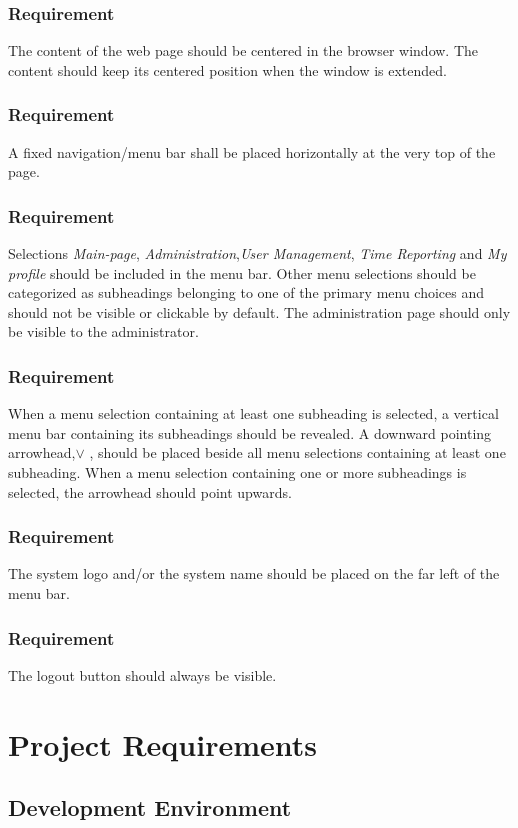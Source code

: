 \documentclass{article}
\begin{document}
\subsubsection{Requirement}
The content of the web page should be centered in the browser window.
The content should keep its centered position when the window is extended.
\subsubsection{Requirement}
A fixed navigation/menu bar shall be placed horizontally at the very top
of the page.
\subsubsection{Requirement}
Selections \textit{Main-page}, \textit{Administration},\textit{User Management}, \textit{Time Reporting}
and \textit{My profile} should be included in the menu bar. Other menu selections
should be categorized as subheadings belonging to one of the primary
menu choices and should not be visible or clickable by default.
The administration page should only be visible to the administrator.
\subsubsection{Requirement}
When a menu selection containing at least one subheading is selected, a
vertical menu bar containing its subheadings should be revealed.
A downward pointing arrowhead,$\vee$ , should be placed beside all menu selections containing at least one subheading. 
When a menu selection containing one or more subheadings is selected, the arrowhead should point
upwards.

\subsubsection{Requirement}
The system logo and/or the system name should be placed on the far left
of the menu bar.

\subsubsection{Requirement}
The logout button should always be visible.

\section{Project Requirements}
\subsection{Development Environment}
\end{document}

